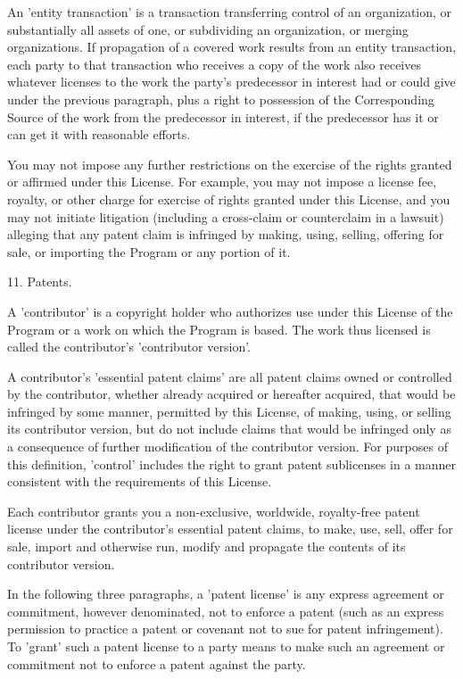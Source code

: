 \documentclass{article}
\begin{document}
  An 'entity transaction' is a transaction transferring control of an
organization, or substantially all assets of one, or subdividing an
organization, or merging organizations.  If propagation of a covered
work results from an entity transaction, each party to that
transaction who receives a copy of the work also receives whatever
licenses to the work the party's predecessor in interest had or could
give under the previous paragraph, plus a right to possession of the
Corresponding Source of the work from the predecessor in interest, if
the predecessor has it or can get it with reasonable efforts.

  You may not impose any further restrictions on the exercise of the
rights granted or affirmed under this License.  For example, you may
not impose a license fee, royalty, or other charge for exercise of
rights granted under this License, and you may not initiate litigation
(including a cross-claim or counterclaim in a lawsuit) alleging that
any patent claim is infringed by making, using, selling, offering for
sale, or importing the Program or any portion of it.

  11. Patents.

  A 'contributor' is a copyright holder who authorizes use under this
License of the Program or a work on which the Program is based.  The
work thus licensed is called the contributor's 'contributor version'.

  A contributor's 'essential patent claims' are all patent claims
owned or controlled by the contributor, whether already acquired or
hereafter acquired, that would be infringed by some manner, permitted
by this License, of making, using, or selling its contributor version,
but do not include claims that would be infringed only as a
consequence of further modification of the contributor version.  For
purposes of this definition, 'control' includes the right to grant
patent sublicenses in a manner consistent with the requirements of
this License.

  Each contributor grants you a non-exclusive, worldwide, royalty-free
patent license under the contributor's essential patent claims, to
make, use, sell, offer for sale, import and otherwise run, modify and
propagate the contents of its contributor version.

  In the following three paragraphs, a 'patent license' is any express
agreement or commitment, however denominated, not to enforce a patent
(such as an express permission to practice a patent or covenant not to
sue for patent infringement).  To 'grant' such a patent license to a
party means to make such an agreement or commitment not to enforce a
patent against the party.
\end{document}
